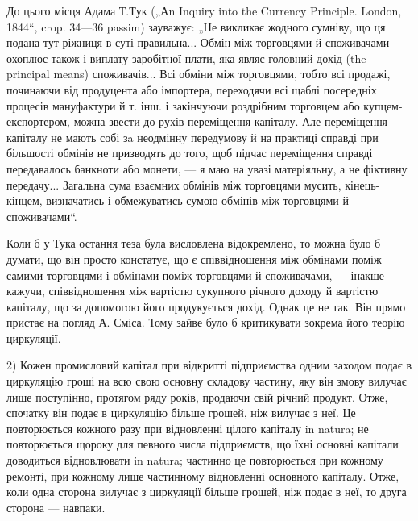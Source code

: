 До цього місця Адама $Т. Т$ук („Аn Inquiry into the Currency Principle.
London, 1844“, crop. 34—36 passim) зауважує: „Не викликає жодного
сумніву, що ця подана тут ріжниця в суті правильна... Обмін між торговцями
й споживачами охоплює також і виплату заробітної плати, яка
являє головний дохід (the principal means) споживачів... Всі обміни між
торговцями, тобто всі продажі, починаючи від продуцента або імпортера,
переходячи всі щаблі посередніх процесів мануфактури й т. інш. і закінчуючи
роздрібним торговцем або купцем-експортером, можна звести
до рухів переміщення капіталу. Але переміщення капіталу не мають собі
зa неодмінну передумову й на практиці справді при більшості обмінів не
призводять до того, щоб підчас переміщення справді передавалось банкноти
або монети, — я маю на увазі матеріяльну, а не фіктивну передачу...
Загальна сума взаємних обмінів між торговцями мусить, кінець-кінцем,
визначатись і обмежуватись сумою обмінів між торговцями й споживачами“.

Коли б у Тука остання теза була висловлена відокремлено, то можна
було б думати, що він просто констатує, що є співвідношення між обмінами
поміж самими торговцями і обмінами поміж торговцями й споживачами, —
інакше кажучи, співвідношення між вартістю сукупного річного доходу й
вартістю капіталу, що за допомогою його продукується дохід. Однак це
не так. Він прямо пристає на погляд А. Сміса. Тому зайве було б
критикувати зокрема його теорію циркуляції.

2) Кожен промисловий капітал при відкритті підприємства одним заходом
подає в циркуляцію гроші на всю свою основну складову частину, яку
він змову вилучає лише поступінно, протягом ряду років, продаючи свій
річний продукт. Отже, спочатку він подає в циркуляцію більше грошей,
ніж вилучає з неї. Це повторюється кожного разу при відновленні цілого
капіталу in natura; не повторюється щороку для певного числа підприємств,
що їхні основні капітали доводиться відновлювати in natura; частинно
це повторюється при кожному ремонті, при кожному лише частинному
відновленні основного капіталу. Отже, коли одна сторона
вилучає з циркуляції більше грошей, ніж подає в неї, то друга сторона —
навпаки.

